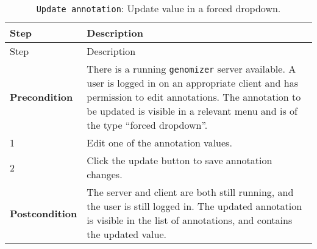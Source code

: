 \begin{longtable}[c]{@{}ll@{}}
\caption{\texttt{Update\ annotation}: Update value in a forced
dropdown.}\tabularnewline
\toprule
\begin{minipage}[b]{0.31\columnwidth}\raggedright\strut
Step
\strut\end{minipage} &
\begin{minipage}[b]{0.63\columnwidth}\raggedright\strut
Description
\strut\end{minipage}\tabularnewline
\midrule
\endfirsthead
\toprule
\begin{minipage}[b]{0.31\columnwidth}\raggedright\strut
Step
\strut\end{minipage} &
\begin{minipage}[b]{0.63\columnwidth}\raggedright\strut
Description
\strut\end{minipage}\tabularnewline
\midrule
\endhead
\begin{minipage}[t]{0.31\columnwidth}\raggedright\strut
\textbf{Precondition}
\strut\end{minipage} &
\begin{minipage}[t]{0.63\columnwidth}\raggedright\strut
There is a running \texttt{genomizer} server available. A user is logged
in on an appropriate client and has permission to edit annotations. The
annotation to be updated is visible in a relevant menu and is of the
type ``forced dropdown''.
\strut\end{minipage}\tabularnewline
\begin{minipage}[t]{0.31\columnwidth}\raggedright\strut
1
\strut\end{minipage} &
\begin{minipage}[t]{0.63\columnwidth}\raggedright\strut
Edit one of the annotation values.
\strut\end{minipage}\tabularnewline
\begin{minipage}[t]{0.31\columnwidth}\raggedright\strut
2
\strut\end{minipage} &
\begin{minipage}[t]{0.63\columnwidth}\raggedright\strut
Click the update button to save annotation changes.
\strut\end{minipage}\tabularnewline
\begin{minipage}[t]{0.31\columnwidth}\raggedright\strut
\textbf{Postcondition}
\strut\end{minipage} &
\begin{minipage}[t]{0.63\columnwidth}\raggedright\strut
The server and client are both still running, and the user is still
logged in. The updated annotation is visible in the list of annotations,
and contains the updated value.
\strut\end{minipage}\tabularnewline
\bottomrule
\end{longtable}

